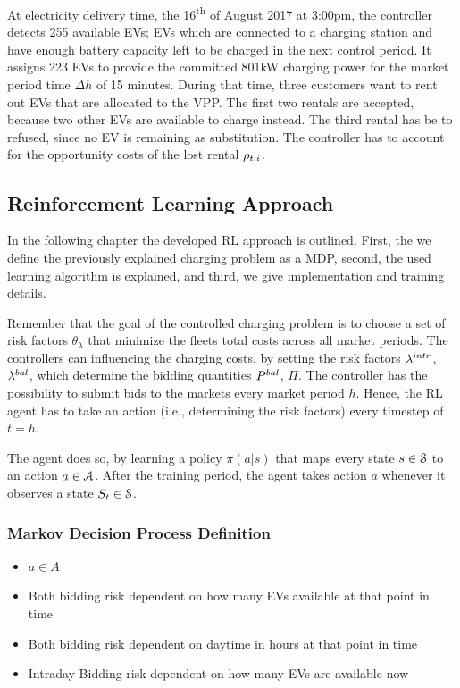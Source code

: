 \documentclass[a4paper, 12pt]{article}
\begin{document}
At electricity delivery time, the 16\textsuperscript{th} of August 2017 at 3:00pm, the
controller detects 255 available EVs; EVs which are connected to a charging
station and have enough battery capacity left to be charged in the next control
period. It assigns 223 EVs to provide the committed 801kW charging power for the
market period time \(\Delta h\) of 15 minutes. During that time, three customers
want to rent out EVs that are allocated to the VPP. The first two rentals are
accepted, because two other EVs are available to charge instead. The third
rental has be to refused, since no EV is remaining as substitution. The
controller has to account for the opportunity costs of the lost rental
\(\oc\).
\subsection{Reinforcement Learning Approach \label{sec-model-rf}}
\label{sec:orgd7fbd73}
In the following chapter the developed RL approach is outlined. First, the we
define the previously explained charging problem as a MDP, second, the used
learning algorithm is explained, and third, we give implementation and training
details.

Remember that the goal of the controlled charging problem is to choose a set of
risk factors \(\theta_{\lambda}\) that minimize the fleets total costs across all
market periods. The controllers can influencing the charging costs, by setting
the risk factors \(\li{}\), \(\lb{}\), which determine the bidding quantities \(\Pb{}\),
\(\Pi{}\). The controller has the possibility to submit bids to the markets every
market period \(h\). Hence, the RL agent has to take an action (i.e., determining
the risk factors) every timestep of \(t = h\).

The agent does so, by learning a policy \(\pi(a|s)\) that maps every state
\(s\in\S\) to an action \(a\in\A\). After the training period, the agent takes
action \(a\) whenever it observes a state \(S_t \in \S\).

\subsubsection{Markov Decision Process Definition}
\label{sec:org5edb05d}


\begin{itemize}
\item \(a \in A\)

\item Both bidding risk dependent on how many EVs available at that point in time
\item Both bidding risk dependent on daytime in hours at that point in time
\item Intraday Bidding risk dependent on how many EVs are available now
\end{itemize}
\end{document}
